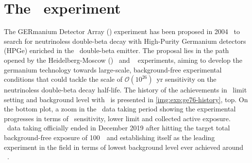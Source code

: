 
\chapter{The \gerda\ experiment}\label{chap:gerda}

The GERmanium Detector Array (\gerda) experiment has been proposed in
2004~\cite{gerda-proposal} to search for neutrinoless double-beta decay with High-Purity
Germanium detectors (HPGe) enriched in the \gesix\ double-beta emitter. The proposal lies
in the path opened by the Heidelberg-Moscow (\hdm)~\cite{Klapdor2001} and
\igex~\cite{Aalseth2002} experiments, aiming to develop the germanium technology towards
large-scale, background-free experimental conditions that could tackle the scale of
$\mathcal{O}(10^{26})$~yr sensitivity on the neutrinoless double-beta decay half-life. The
history of the achievements in \thalfzero\ limit setting and background level with \gesix\
is presented in \cref{img:exp:ge76-history}, top. On the bottom plot, a zoom in the
\gerda\ data taking period showing the experimental progresses in terms of \thalfzero\
sensitivity, lower limit and collected active exposure.  \gerda\ data taking officially
ended in December 2019 after hitting the target total background-free exposure of 100~\kgyr\ and
establishing itself as the leading experiment in the field in terms of lowest background
level ever achieved around \qbb~\cite{Agostini2019a}.

